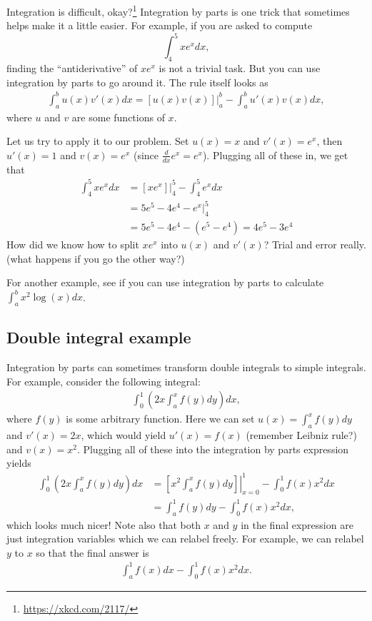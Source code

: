 \documentclass{article}
\begin{document}
Integration is difficult, okay?\footnote{\url{https://xkcd.com/2117/}} Integration by parts is one trick that sometimes helps make it a little easier. For example, if you are asked to compute 
$$\int_4^5 xe^x dx,$$ finding the ``antiderivative'' of $xe^x$ is not a trivial task. But you can use integration by parts to go around it. The rule itself looks as
\begin{align} \label{eq:IBP}
	\int_a^b u(x) v'(x) dx = [u(x)v(x)]|_a^b - \int_a^b u'(x) v(x) dx,
\end{align}
where $u$ and $v$ are some functions of $x$. 

Let us try to apply it to our problem. Set $u(x)=x$ and $v'(x)=e^x$, then $u'(x)=1$ and $v(x)=e^x$ (since $\frac{d}{dx}e^x = e^x$). Plugging all of these in, we get that
\begin{align*}
	\int_4^5 xe^x dx &= \left.\left[xe^x\right]\right|_4^5 - \int_4^5 e^x dx
	\\
	&=5e^5 - 4e^4 - \left. e^x \right|_4^5
	\\
	&=5e^5 - 4e^4 - \left(e^5 - e^4\right) = 4e^5 - 3e^4
\end{align*}
How did we know how to split $xe^x$ into $u(x)$ and $v'(x)$? Trial and error really. (what happens if you go the other way?)

For another example, see if you can use integration by parts to calculate $\int_a^b x^2 \log (x) dx$.


\subsection{Double integral example}

Integration by parts can sometimes transform double integrals to simple integrals. For example, consider the following integral:
\begin{align*}
	\int_0^1 \left(2x \int_a^x f(y) dy\right) dx,
\end{align*}
where $f(y)$ is some arbitrary function. Here we can set $u(x) = \int_a^x f(y) dy$ and $v'(x) = 2x$, which would yield $u'(x) = f(x)$ (remember Leibniz rule?) and $v(x) = x^2$. Plugging all of these into the integration by parts expression yields
\begin{align*}
	\int_0^1 \left(2x \int_a^x f(y) dy\right) dx &= \left.\left[ x^2 \int_a^x f(y)dy \right]\right|_{x=0}^1 - \int_0^1 f(x) x^2 dx
	\\
	&= \int_a^1 f(y) dy - \int_0^1 f(x) x^2 dx,
\end{align*}
which looks much nicer! Note also that both $x$ and $y$ in the final expression are just integration variables which we can relabel freely. For example, we can relabel $y$ to $x$ so that the final answer is
\begin{align*}
	\int_a^1 f(x) dx - \int_0^1 f(x) x^2 dx.
\end{align*}
\end{document}
